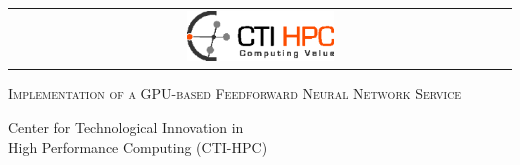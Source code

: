\begin{titlepage}
    \begin{center}

    \begin{tabular}{c}
        \includegraphics[width=0.3\textwidth]{img/cti-hpc.eps}\hfill
    \end{tabular}

    \vspace{4cm}

    \textsc{\huge
      Implementation of a GPU-based
      Feedforward Neural Network Service
    }

    \vspace{3cm}

    \large{{Center for Technological Innovation in}}\\
    \large{{High Performance Computing (CTI-HPC)}}

    \vfill
    \normalsize{\sc{\today}}\\
    \end{center}
\end{titlepage}
